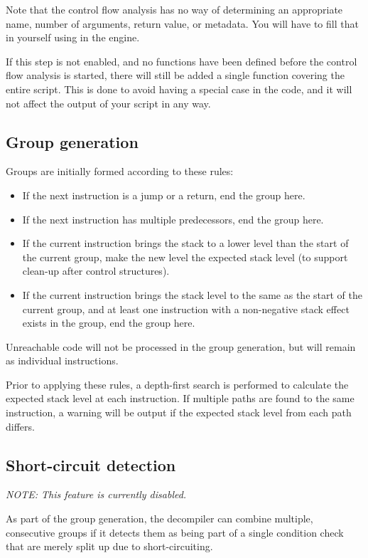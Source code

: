 Note that the control flow analysis has no way of determining an appropriate name, number of arguments, return value, or metadata. You will have to fill that in yourself using  in the engine.

If this step is not enabled, and no functions have been defined before the control flow analysis is started, there will still be added a single function covering the entire script. This is done to avoid having a special case in the code, and it will not affect the output of your script in any way.

\subsection{Group generation}
Groups are initially formed according to these rules:
\begin{itemize}
\item If the next instruction is a jump or a return, end the group here.
\item If the next instruction has multiple predecessors, end the group here.
\item If the current instruction brings the stack to a lower level than the start of the current group, make the new level the expected stack level (to support clean-up after control structures).
\item If the current instruction brings the stack level to the same as the start of the current group, and at least one instruction with a non-negative stack effect exists in the group, end the group here.
\end{itemize}

Unreachable code will not be processed in the group generation, but will remain as individual instructions.

Prior to applying these rules, a depth-first search is performed to calculate the expected stack level at each instruction. If multiple paths are found to the same instruction, a warning will be output if the expected stack level from each path differs.

\subsection{Short-circuit detection}
\emph{NOTE: This feature is currently disabled.}

As part of the group generation, the decompiler can combine multiple, consecutive groups if it detects them as being part of a single condition check that are merely split up due to short-circuiting.

